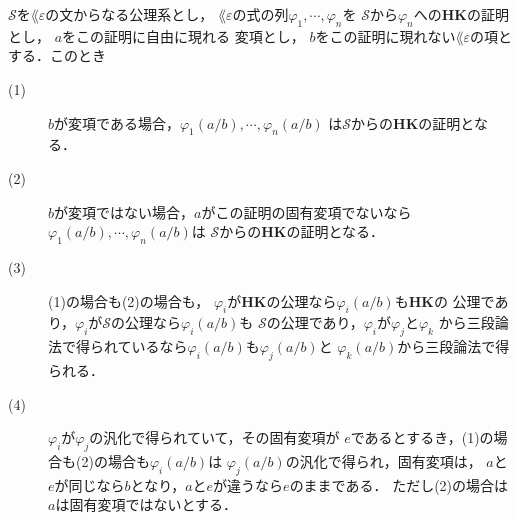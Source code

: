 	\begin{screen}
		\begin{metathm}[証明に現れる変項に代入しても証明]
		\label{metathm:substitute_HK_proof}
			$\mathscr{S}$を$\lang{\varepsilon}$の文からなる公理系とし，
			$\lang{\varepsilon}$の式の列$\varphi_{1},\cdots,\varphi_{n}$を
			$\mathscr{S}$から$\varphi_{n}$への{\bf HK}の証明とし，
			$a$をこの証明に自由に現れる\footnotemark
			変項とし，
			$b$をこの証明に現れない$\lang{\varepsilon}$の項とする．このとき
			\begin{description}
				\item[(1)] $b$が変項である場合，$\varphi_{1}(a/b),\cdots,\varphi_{n}(a/b)$
					は$\mathscr{S}$からの{\bf HK}の証明となる．
					
				\item[(2)] $b$が変項ではない場合\footnotemark，$a$がこの証明の固有変項でないなら
					$\varphi_{1}(a/b),\cdots,\varphi_{n}(a/b)$は
					$\mathscr{S}$からの{\bf HK}の証明となる．
					
				\item[(3)] (1)の場合も(2)の場合も，
					$\varphi_{i}$が{\bf HK}の公理なら$\varphi_{i}(a/b)$も{\bf HK}の
					公理であり，$\varphi_{i}$が$\mathscr{S}$の公理なら$\varphi_{i}(a/b)$も
					$\mathscr{S}$の公理であり，$\varphi_{i}$が$\varphi_{j}$と$\varphi_{k}$
					から三段論法で得られているなら$\varphi_{i}(a/b)$も$\varphi_{j}(a/b)$と
					$\varphi_{k}(a/b)$から三段論法で得られる．
					
				\item[(4)] $\varphi_{i}$が$\varphi_{j}$の汎化で得られていて，その固有変項が
					$e$であるとするき，(1)の場合も(2)の場合も$\varphi_{i}(a/b)$は
					$\varphi_{j}(a/b)$の汎化で得られ，固有変項は，
					$a$と$e$が同じなら$b$となり，$a$と$e$が違うなら$e$のままである．
					ただし(2)の場合は$a$は固有変項ではないとする．
			\end{description}
		\end{metathm}
	\end{screen}
	
	
